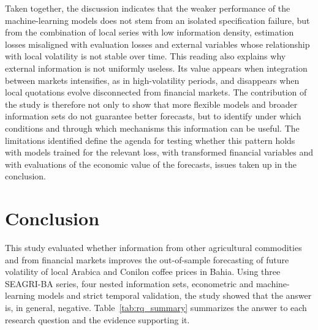 \documentclass[a4paper,fleqn]{cas-sc}
\begin{document}
Taken together, the discussion indicates that the weaker performance of the machine-learning models does not stem from an isolated specification failure, but from the combination of local series with low information density, estimation losses misaligned with evaluation losses and external variables whose relationship with local volatility is not stable over time. This reading also explains why external information is not uniformly useless. Its value appears when integration between markets intensifies, as in high-volatility periods, and disappears when local quotations evolve disconnected from financial markets. The contribution of the study is therefore not only to show that more flexible models and broader information sets do not guarantee better forecasts, but to identify under which conditions and through which mechanisms this information can be useful. The limitations identified define the agenda for testing whether this pattern holds with models trained for the relevant loss, with transformed financial variables and with evaluations of the economic value of the forecasts, issues taken up in the conclusion.

\section{Conclusion}
\label{sec:conclusion}

This study evaluated whether information from other agricultural commodities and from financial markets improves the out-of-sample forecasting of future volatility of local Arabica and Conilon coffee prices in Bahia. Using three SEAGRI-BA series, four nested information sets, econometric and machine-learning models and strict temporal validation, the study showed that the answer is, in general, negative. Table~\ref{tab:rq_summary} summarizes the answer to each research question and the evidence supporting it.
\end{document}
